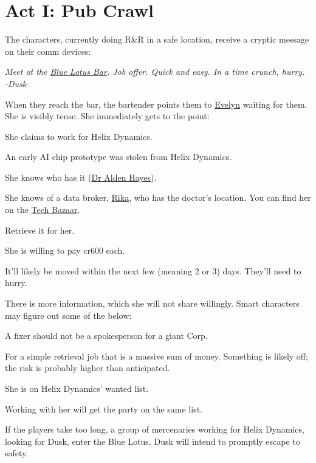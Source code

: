 \chapter{Act I: Pub Crawl}
\label{ch:act1}
\vspace{-20mm} %
The characters, currently doing R\&R in a safe location,
receive a cryptic message on their comm devices:
\begin{exampleblock}
	\itshape
	Meet at the \hyperref[location:bar]{Blue Lotus Bar}.
	Job offer. Quick and easy.
	In a time crunch, hurry.
	\\%
	-Dusk
\end{exampleblock}
When they reach the bar, the bartender points them to \hyperref[char:dusk]{Evelyn} waiting for them.
She is visibly tense.
She immediately gets to the point:
\begin{sitemize}
	\item She claims to work for Helix Dynamics.
	\item An early AI chip prototype was stolen from Helix Dynamics.
	\item She knows who has it (\hyperref[char:hayes]{Dr Alden Hayes}).
	\item She knows of a data broker, \hyperref[char:rika]{Rika},
		who has the doctor's location.
		You can find her on the \hyperref[location:techbazaar]{Tech Bazaar}.
	\item Retrieve it for her.
	\item She is willing to pay cr600 each.
	\item It'll likely be moved within the next few (meaning 2 or 3) days.
		They'll need to hurry.
\end{sitemize}
\vspace{-5mm}
There is more information,
	which she will not share willingly.
Smart characters may figure out some of the below:
\begin{sitemize}
	\item A fixer should not be a spokesperson for a giant Corp.
	\item For a simple retrieval job that is a massive sum of money.
		Something is likely off; the risk is probably higher than anticipated.
	\item She is on Helix Dynamics' wanted list.
	\item Working with her will get the party on the same list.
\end{sitemize}

\vspace{-5mm}
If the players take too long,
	a group of mercenaries working for Helix Dynamics,
	looking for Dusk,
	enter the Blue Lotus.
Dusk will intend to promptly escape to safety.
